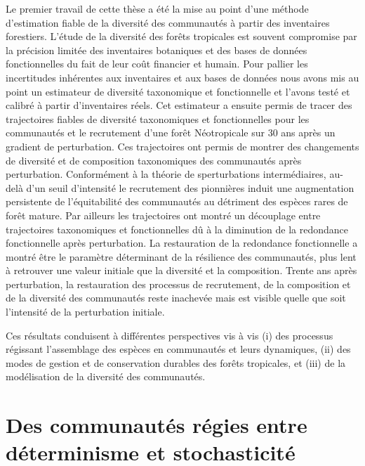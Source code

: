 \documentclass[
  11pt,
  french,
  A4paper,
  extrafontsizes,onecolumn,openright
  ]{memoir}
\begin{document}
Le premier travail de cette thèse a été la mise au point d'une méthode
d'estimation fiable de la diversité des communautés à partir des
inventaires forestiers. L'étude de la diversité des forêts tropicales
est souvent compromise par la précision limitée des inventaires
botaniques et des bases de données fonctionnelles du fait de leur coût
financier et humain. Pour pallier les incertitudes inhérentes aux
inventaires et aux bases de données nous avons mis au point un
estimateur de diversité taxonomique et fonctionnelle et l'avons testé et
calibré à partir d'inventaires réels. Cet estimateur a ensuite permis de
tracer des trajectoires fiables de diversité taxonomiques et
fonctionnelles pour les communautés et le recrutement d'une forêt
Néotropicale sur 30 ans après un gradient de perturbation. Ces
trajectoires ont permis de montrer des changements de diversité et de
composition taxonomiques des communautés après perturbation.
Conformément à la théorie de sperturbations intermédiaires, au-delà d'un
seuil d'intensité le recrutement des pionnières induit une augmentation
persistente de l'équitabilité des communautés au détriment des espèces
rares de forêt mature. Par ailleurs les trajectoires ont montré un
découplage entre trajectoires taxonomiques et fonctionnelles dû à la
diminution de la redondance fonctionnelle après perturbation. La
restauration de la redondance fonctionnelle a montré être le paramètre
déterminant de la résilience des communautés, plus lent à retrouver une
valeur initiale que la diversité et la composition. Trente ans après
perturbation, la restauration des processus de recrutement, de la
composition et de la diversité des communautés reste inachevée mais est
visible quelle que soit l'intensité de la perturbation initiale.

Ces résultats conduisent à différentes perspectives vis à vis (i) des
processus régissant l'assemblage des espèces en communautés et leurs
dynamiques, (ii) des modes de gestion et de conservation durables des
forêts tropicales, et (iii) de la modélisation de la diversité des
communautés.

\section{Des communautés régies entre déterminisme et
stochasticité}\label{des-communautes-regies-entre-determinisme-et-stochasticite}
\end{document}
